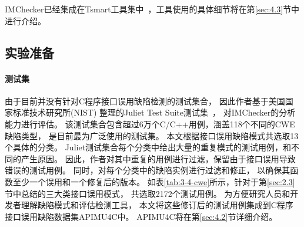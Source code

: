IMChecker已经集成在Tsmart工具集中~\cite{tsmart}，工具使用的具体细节将在第\ref{sec:4.3}节中进行介绍。

\subsection{实验准备}



\paragraph{测试集} 
由于目前并没有针对C程序接口误用缺陷检测的测试集合，
因此作者基于美国国家标准技术研究所(NIST) 整理的Juliet Test Suite测试集~\cite{juliet}，
对IMChecker的分析能力进行评估。
该测试集合包含超过6万个C/C++用例，涵盖118个不同的CWE缺陷类型，
是目前最为广泛使用的测试集。
本文根据接口误用缺陷模式共选取13个具体的分类。
Juliet测试集合每个分类中给出大量的重复模式的测试用例，和不同的产生原因。
因此，作者对其中重复的用例进行过滤，保留由于接口误用导致错误的测试用例。
同时，对每个分类中的缺陷实例进行过滤和修正，
以确保其函数至少一个误用和一个修复后的版本。
如表\ref{tab:3-4-cwe}所示，针对于第\ref{sec:2.3}节中总结的三大类接口误用模式，
共选取2172个测试用例。
为方便研究人员和开发者理解缺陷模式和评估检测工具，
本文将这些修订后的测试用例集成到C程序接口误用缺陷数据集APIMU4C中。
APIMU4C将在第\ref{sec:4.2}节详细介绍。

